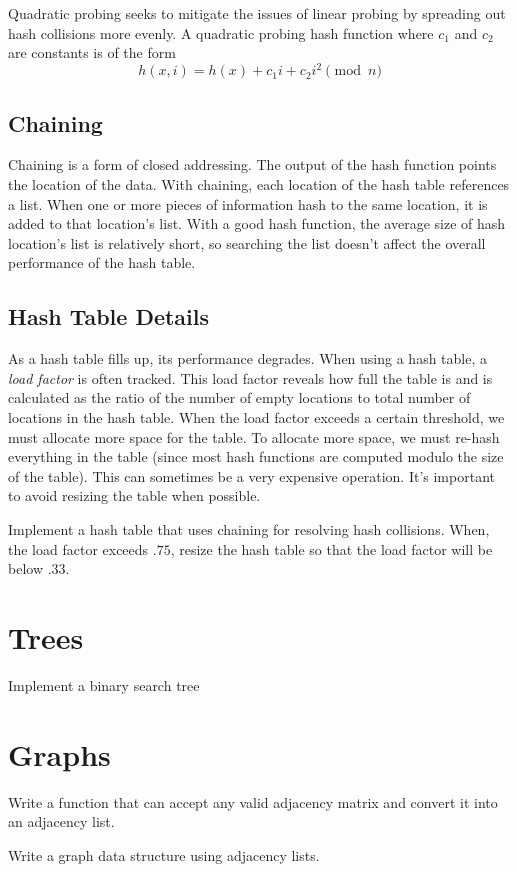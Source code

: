 Quadratic probing seeks to mitigate the issues of linear probing by spreading out hash collisions more evenly.   A quadratic probing hash function where $c_1$ and $c_2$ are constants is of the form
\begin{equation*}
h(x, i) = h(x) + c_1i + c_2i^2 \pmod{n}
\end{equation*}

\subsection*{Chaining}
Chaining is a form of closed addressing.  The output of the hash function points the location of the data. 
With chaining, each location of the hash table references a list.
When one or more pieces of information hash to the same location, it is added to that location's list.  With a good hash function, the average size of hash location's list is relatively short, so searching the list doesn't affect the overall performance of the hash table.

\subsection*{Hash Table Details}
As a hash table fills up, its performance degrades.
When using a hash table, a \emph{load factor} is often tracked.
This load factor reveals how full the table is and is calculated as the ratio of the number of empty locations to total number of locations in the hash table.
When the load factor exceeds a certain threshold, we must allocate more space for the table.
To allocate more space, we must re-hash everything in the table (since most hash functions are computed modulo the size of the table).
This can sometimes be a very expensive operation.
It's important to avoid resizing the table when possible.

\begin{problem}
Implement a hash table that uses chaining for resolving hash collisions.
When, the load factor exceeds $.75$, resize the hash table so that the load factor will be below $.33$.
\end{problem}

\section*{Trees}

\begin{problem}
Implement a binary search tree
\end{problem}


\section*{Graphs}

\begin{problem}
Write a function that can accept any valid adjacency matrix and convert it into an adjacency list.
\end{problem}



\begin{problem}
Write a graph data structure using adjacency lists.
\end{problem}